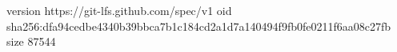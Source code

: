 version https://git-lfs.github.com/spec/v1
oid sha256:dfa94cedbe4340b39bbca7b1c184cd2a1d7a140494f9fb0fe0211f6aa08c27fb
size 87544

